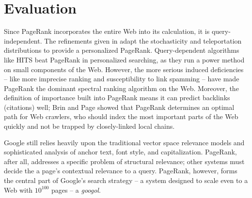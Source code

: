 \documentclass[12pt]{article}
\begin{document}
\section{Evaluation}
Since PageRank incorporates the entire Web into its calculation, it is
query-independent. The refinements given in
\cite{haveliwalaAnalyticalComparisonApproaches2003} adapt the stochasticity and
teleportation distributions to provide a personalized PageRank. Query-dependent
algorithms like HITS beat PageRank in personalized searching, as they run a
power method on small components of the Web. However, the more serious induced
deficiencies -- like more imprecise ranking and susceptibility to link spamming
-- have made PageRank the dominant spectral ranking algorithm on the Web.
Moreover, the definition of importance built into PageRank means it can predict
backlinks (citations) well; Brin and Page \cite{brinPageRankCitationRanking1998}
showed that PageRank determines an optimal path for Web crawlers, who should
index the most important parts of the Web quickly and not be trapped by
closely-linked local chains.

Google still relies heavily upon the traditional vector space relevance models
and sophisticated analysis of anchor text, font style, and capitalization.
PageRank, after all, addresses a specific problem of structural relevance; other
systems must decide the a page's contextual relevance to a query. PageRank,
however, forms the central part of Google's search strategy -- a system designed
to scale even to a Web with $10^{100}$ pages -- a \textit{googol}.

\newpage


\end{document}
